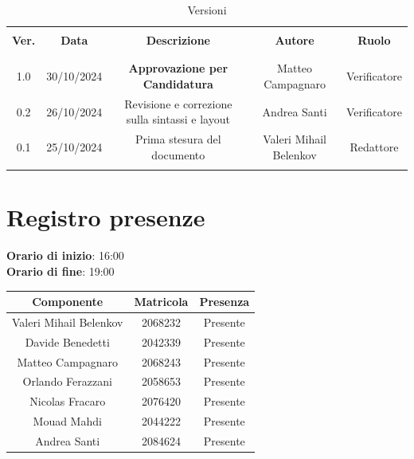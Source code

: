 \documentclass[italian, 12pt]{article}
\begin{document}
\pagestyle{mystyle}


\begin{table}[!h]
	\caption{Versioni}
	\begin{center}
		\begin{tabular}{ c c c c c}
			\hline \\[-2ex]
			\textbf{Ver.} & \textbf{Data} & \textbf{Descrizione} & \textbf{Autore} & \textbf{Ruolo}  \\
			\\[-2ex] \hline \\[-1.5ex]
            1.0 & 30/10/2024 & \textbf{Approvazione per Candidatura} & Matteo Campagnaro & Verificatore\\
            0.2 & 26/10/2024 & Revisione e correzione sulla sintassi e layout & Andrea Santi & Verificatore  \\
			0.1 & 25/10/2024 & Prima stesura del documento & Valeri Mihail Belenkov & Redattore\\
			\\[-1.5ex] \hline
		\end{tabular}
	\end{center}
\end{table}


\tableofcontents
\newpage


\section{Registro presenze}

\textbf{Orario di inizio}: 16:00\\
\textbf{Orario di fine}: 19:00\\


\begin{flushleft}
	\begin{table}[!h]
	\begin{tabular}{ |c|c|c| } 
		\hline
		\textbf{Componente} & \textbf{Matricola} & \textbf{Presenza} \\
  \hline 
		Valeri Mihail Belenkov & 2068232 & Presente \\
		Davide Benedetti 	& 2042339 & Presente \\
		Matteo Campagnaro	& 2068243 & Presente \\
		Orlando Ferazzani 	& 2058653 & Presente \\
		Nicolas Fracaro 	& 2076420 & Presente \\
		Mouad Mahdi		    & 2044222 & Presente \\ 
		Andrea Santi 	    & 2084624 & Presente \\
		\hline
	\end{tabular}
	\end{table}
	\end{flushleft}
\end{document}
